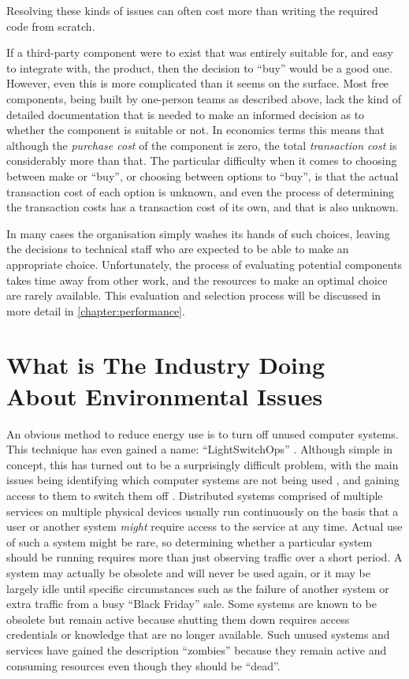 Resolving these kinds of issues can often cost more than writing the required code from scratch.

If a third-party component were to exist that was entirely suitable for, and easy to integrate with, the product, then the decision to \enquote{buy} would be a good one. However, even this is more complicated than it seems on the surface. Most free components, being built by one-person teams as described above, lack the kind of detailed documentation that is needed to make an informed decision as to whether the component is suitable or not. In economics terms this means that although the \emph{purchase cost} of the component is zero, the total \emph{transaction cost} \citep{OECD2003} is considerably more than that. The particular difficulty when it comes to choosing between make or \enquote{buy}, or choosing between options to \enquote{buy}, is that the actual transaction cost of each option is unknown, and even the process of determining the transaction costs has a transaction cost of its own, and that is also unknown.

In many cases the organisation simply washes its hands of such choices, leaving the decisions to technical staff who are expected to be able to make an appropriate choice. Unfortunately, the process of evaluating potential components takes time away from other work, and the resources to make an optimal choice are rarely available. This evaluation and selection process will be discussed in more detail in \autoref{chapter:performance}.


\section{What is The Industry Doing About Environmental Issues}
\label{section:industry}

An obvious method to reduce energy use is to turn off unused computer systems. This technique has even gained a name: \enquote{LightSwitchOps} \citep{RedHat2022}. Although simple in concept, this has turned out to be a surprisingly difficult problem, with the main issues being identifying which computer systems are not being used \citep{Lechelt2024}, and gaining access to them to switch them off \citep{Wiggers2023}. Distributed systems comprised of multiple services on multiple physical devices usually run continuously on the basis that a user or another system \emph{might} require access to the service at any time. Actual use of such a system might be rare, so determining whether a particular system should be running requires more than just observing traffic over a short period. A system may actually be obsolete and will never be used again, or it may be largely idle until specific circumstances such as the failure of another system or extra traffic from a busy \enquote{Black Friday} sale. Some systems are known to be obsolete but remain active because shutting them down requires access credentials or knowledge that are no longer available. Such unused systems and services have gained the description \enquote{\gls{zombie}s} because they remain active and consuming resources even though they should be \enquote{dead}. 

